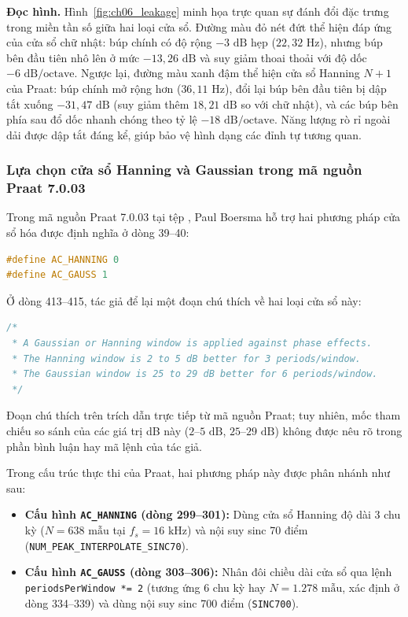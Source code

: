 \textbf{Đọc hình.} Hình~\ref{fig:ch06_leakage} minh họa trực quan sự đánh đổi đặc trưng trong miền tần số giữa hai loại cửa sổ. Đường màu đỏ nét đứt thể hiện đáp ứng của cửa sổ chữ nhật: búp chính có độ rộng $-3\text{ dB}$ hẹp ($22{,}32\text{ Hz}$), nhưng búp bên đầu tiên nhô lên ở mức $-13{,}26\text{ dB}$ và suy giảm thoai thoải với độ dốc $-6\text{ dB/octave}$. Ngược lại, đường màu xanh đậm thể hiện cửa sổ Hanning $N+1$ của Praat: búp chính mở rộng hơn ($36{,}11\text{ Hz}$), đổi lại búp bên đầu tiên bị dập tắt xuống $-31{,}47\text{ dB}$ (suy giảm thêm $18{,}21\text{ dB}$ so với chữ nhật), và các búp bên phía sau đổ dốc nhanh chóng theo tỷ lệ $-18\text{ dB/octave}$. Năng lượng rò rỉ ngoài dải được dập tắt đáng kể, giúp bảo vệ hình dạng các đỉnh tự tương quan.

\subsubsection*{Lựa chọn cửa sổ Hanning và Gaussian trong mã nguồn Praat 7.0.03}
Trong mã nguồn Praat 7.0.03 tại tệp , Paul Boersma hỗ trợ hai phương pháp cửa sổ hóa được định nghĩa ở dòng 39--40:
\begin{lstlisting}[language=C++, numbers=none]
#define AC_HANNING 0
#define AC_GAUSS 1
\end{lstlisting}

Ở dòng 413--415, tác giả để lại một đoạn chú thích về hai loại cửa sổ này:
\begin{lstlisting}[language=C++, numbers=none]
/*
 * A Gaussian or Hanning window is applied against phase effects.
 * The Hanning window is 2 to 5 dB better for 3 periods/window.
 * The Gaussian window is 25 to 29 dB better for 6 periods/window.
 */
\end{lstlisting}

Đoạn chú thích trên trích dẫn trực tiếp từ mã nguồn Praat; tuy nhiên, mốc tham chiếu so sánh của các giá trị dB này ($2\text{--}5\text{ dB}$, $25\text{--}29\text{ dB}$) không được nêu rõ trong phần bình luận hay mã lệnh của tác giả.

Trong cấu trúc thực thi của Praat, hai phương pháp này được phân nhánh như sau:
\begin{itemize}[leftmargin=1.5em, itemsep=2pt]
    \item \textbf{Cấu hình \texttt{AC\_HANNING} (dòng 299--301):} Dùng cửa sổ Hanning độ dài 3 chu kỳ ($N = 638\text{ mẫu}$ tại $f_s = 16\text{ kHz}$) và nội suy sinc 70 điểm (\texttt{NUM\_PEAK\_INTERPOLATE\_SINC70}).
    \item \textbf{Cấu hình \texttt{AC\_GAUSS} (dòng 303--306):} Nhân đôi chiều dài cửa sổ qua lệnh \texttt{periodsPerWindow *= 2} (tương ứng 6 chu kỳ hay $N = 1.278\text{ mẫu}$, xác định ở dòng 334--339) và dùng nội suy sinc 700 điểm (\texttt{SINC700}).
\end{itemize}

